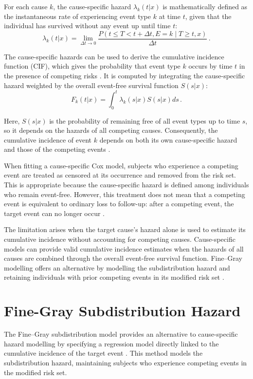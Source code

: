 \documentclass[a4paper,twoside,12pt]{report}
\begin{document}
For each cause $k$, the cause-specific hazard $\lambda_k(t|x)$ is mathematically defined as the instantaneous rate of experiencing event type $k$ at time $t$, given that the individual has survived without any event up until time $t$:
$$\lambda_k(t|x) = \lim_{\Delta t \to 0} \frac{P(t \le T < t+\Delta t, E = k \mid T \ge t, x)}{\Delta t} \,.$$

The cause-specific hazards can be used to derive the cumulative incidence function (CIF), which gives the probability that event type $k$ occurs by time $t$ in the presence of competing risks \citep{prentice1978analysis, pintilie2006competing}. It is computed by integrating the cause-specific hazard weighted by the overall event-free survival function $S(s|x)$:
$$F_k(t|x) = \int_0^t \lambda_k(s|x) S(s|x) ds \,.$$

Here, $S(s|x)$ is the probability of remaining free of all event types up to time $s$, so it depends on the hazards of all competing causes. Consequently, the cumulative incidence of event $k$ depends on both its own cause-specific hazard and those of the competing events \citep{andersen2012competing}.

When fitting a cause-specific Cox model, subjects who experience a competing event are treated as censored at its occurrence and removed from the risk set. This is appropriate because the cause-specific hazard is defined among individuals who remain event-free. However, this treatment does not mean that a competing event is equivalent to ordinary loss to follow-up: after a competing event, the target event can no longer occur \citep{andersen2012competing}.

The limitation arises when the target cause's hazard alone is used to estimate its cumulative incidence without accounting for competing causes. Cause-specific models can provide valid cumulative incidence estimates when the hazards of all causes are combined through the overall event-free survival function. Fine--Gray modelling offers an alternative by modelling the subdistribution hazard and retaining individuals with prior competing events in its modified risk set \citep{andersen2012competing, FineGray1999}.

\section{Fine-Gray Subdistribution Hazard}

The Fine--Gray subdistribution model provides an alternative to cause-specific hazard modelling by specifying a regression model directly linked to the cumulative incidence of the target event \citep{FineGray1999}. This method models the subdistribution hazard, maintaining subjects who experience competing events in the modified risk set.
\end{document}

